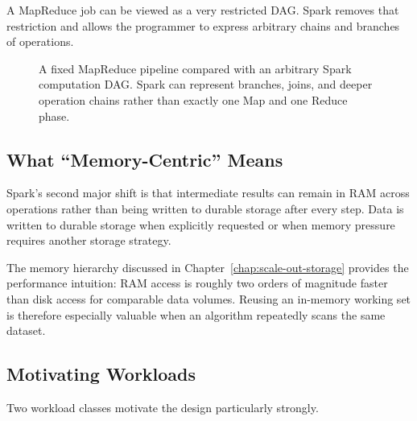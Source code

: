 \documentclass[11pt,a4paper,oneside]{book}
\begin{document}
A MapReduce job can be viewed as a very restricted DAG. Spark removes that restriction and allows the programmer to express arbitrary chains and branches of operations.

\begin{figure}[htbp]
\centering
{}
\caption{A fixed MapReduce pipeline compared with an arbitrary Spark computation DAG. Spark can represent branches, joins, and deeper operation chains rather than exactly one Map and one Reduce phase.}
\label{fig:spark-dag-vs-mapreduce}
\end{figure}

\subsection{What ``Memory-Centric'' Means}

Spark's second major shift is that intermediate results can remain in RAM across operations rather than being written to durable storage after every step. Data is written to durable storage when explicitly requested or when memory pressure requires another storage strategy.

The memory hierarchy discussed in Chapter~\ref{chap:scale-out-storage} provides the performance intuition: RAM access is roughly two orders of magnitude faster than disk access for comparable data volumes. Reusing an in-memory working set is therefore especially valuable when an algorithm repeatedly scans the same dataset.

\subsection{Motivating Workloads}

Two workload classes motivate the design particularly strongly.
\end{document}

